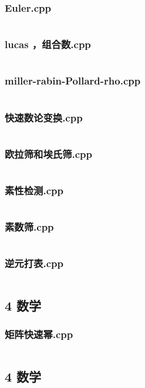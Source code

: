 \documentclass{article}
\begin{document}
\subsubsection{Euler.cpp}
\inputminted{c++}{/home/zzuzxy/t2/ACM-template/4 数学/数论/Euler.cpp}
\subsubsection{lucas ，组合数.cpp}
\inputminted{c++}{/home/zzuzxy/t2/ACM-template/4 数学/数论/lucas ，组合数.cpp}
\subsubsection{miller-rabin-Pollard-rho.cpp}
\inputminted{c++}{/home/zzuzxy/t2/ACM-template/4 数学/数论/miller-rabin-Pollard-rho.cpp}
\subsubsection{快速数论变换.cpp}
\inputminted{c++}{/home/zzuzxy/t2/ACM-template/4 数学/数论/快速数论变换.cpp}
\subsubsection{欧拉筛和埃氏筛.cpp}
\inputminted{c++}{/home/zzuzxy/t2/ACM-template/4 数学/数论/欧拉筛和埃氏筛.cpp}
\subsubsection{素性检测.cpp}
\inputminted{c++}{/home/zzuzxy/t2/ACM-template/4 数学/数论/素性检测.cpp}
\subsubsection{素数筛.cpp}
\inputminted{c++}{/home/zzuzxy/t2/ACM-template/4 数学/数论/素数筛.cpp}
\subsubsection{逆元打表.cpp}
\inputminted{c++}{/home/zzuzxy/t2/ACM-template/4 数学/数论/逆元打表.cpp}
\subsection{4 数学}
\subsubsection{矩阵快速幂.cpp}
\inputminted{c++}{/home/zzuzxy/t2/ACM-template/4 数学/矩阵快速幂.cpp}
\subsection{4 数学}
\end{document}
